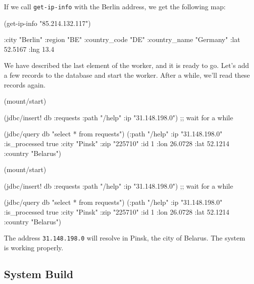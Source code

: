 \fi

\noindent
If we call \verb|get-ip-info| with the Berlin address, we get the following map:

\begin{english}
  \begin{clojure}
(get-ip-info "85.214.132.117")

{:city "Berlin"
 :region "BE"
 :country_code "DE"
 :country_name "Germany"
 :lat 52.5167
 :lng 13.4}
  \end{clojure}
\end{english}

We have described the last element of the worker, and it is ready to go. Let's add a few records to the database and start the worker. After a while, we'll read these records again.

\ifnarrow

\begin{english}
  \begin{clojure}
(mount/start)

(jdbc/insert! db :requests
  {:path "/help" :ip "31.148.198.0"})
;; wait for a while

(jdbc/query db "select * from requests")
({:path "/help"
  :ip "31.148.198.0"
  :is_processed true
  :city "Pinsk"
  :zip "225710" :id 1
  :lon 26.0728 :lat 52.1214
  :country "Belarus"})
  \end{clojure}
\end{english}

\else

\begin{english}
  \begin{clojure}
(mount/start)

(jdbc/insert! db :requests {:path "/help" :ip "31.148.198.0"})
;; wait for a while

(jdbc/query db "select * from requests")
({:path "/help" :ip "31.148.198.0" :is_processed true
  :city "Pinsk" :zip "225710" :id 1
  :lon 26.0728 :lat 52.1214 :country "Belarus"})
  \end{clojure}
\end{english}

\fi

The address \verb|31.148.198.0| will resolve in Pinsk, the city of Belarus. The system is working properly.

\subsection{System Build}

